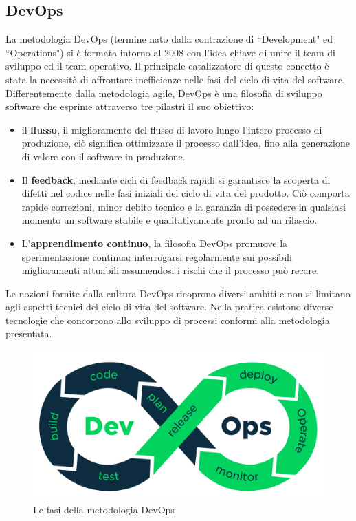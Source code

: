 \subsection{DevOps}
La metodologia DevOps (termine nato dalla contrazione di ``Development" ed ``Operations") si è formata intorno al 2008 con l'idea chiave di unire il team di sviluppo ed il team operativo. Il principale catalizzatore di questo concetto è stata la necessità di affrontare inefficienze nelle fasi del ciclo di vita del software. Differentemente dalla metodologia agile, DevOps è una filosofia di sviluppo software che esprime attraverso tre pilastri il suo obiettivo:

\begin{itemize}
	\item il \textbf{flusso}, il miglioramento del flusso di lavoro lungo l'intero processo di produzione, ciò significa ottimizzare il processo dall'idea, fino alla generazione di valore con il software in produzione.
	\item Il \textbf{feedback}, mediante cicli di feedback rapidi si garantisce la scoperta di difetti nel codice nelle fasi iniziali del ciclo di vita del prodotto. Ciò comporta rapide correzioni, minor debito tecnico e la garanzia di possedere in qualsiasi momento un software stabile e qualitativamente pronto ad un rilascio.
	\item L'\textbf{apprendimento continuo}, la filosofia DevOps promuove la sperimentazione continua: interrogarsi regolarmente sui possibili miglioramenti attuabili assumendosi i rischi che il processo può recare.
\end{itemize}

Le nozioni fornite dalla cultura DevOps ricoprono diversi ambiti e non si limitano agli aspetti tecnici del ciclo di vita del software. Nella pratica esistono diverse tecnologie che concorrono allo sviluppo di processi conformi alla metodologia presentata.

\begin{figure}[htb]
	\centering
	\includegraphics[width=.8\linewidth]{figures/devops-process.png}
	\caption{Le fasi della metodologia DevOps}
	\label{fig:devops-process}
\end{figure}

